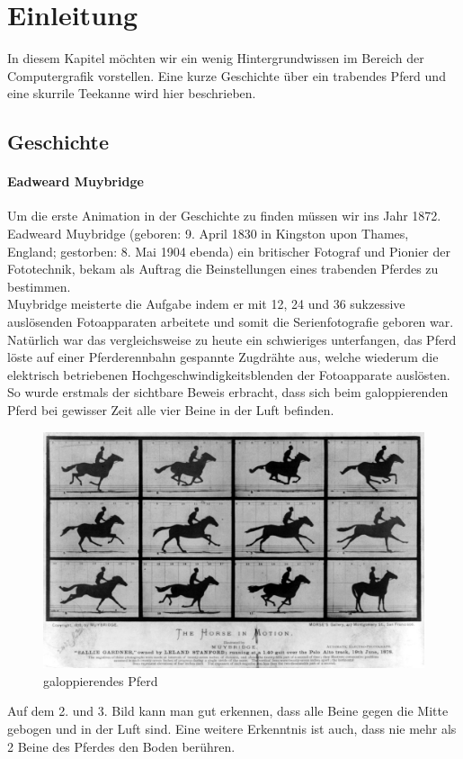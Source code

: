 \chapter{Einleitung}
In diesem Kapitel möchten wir ein wenig Hintergrundwissen im Bereich der Computergrafik vorstellen. Eine kurze Geschichte über ein trabendes Pferd und eine skurrile Teekanne wird hier beschrieben.

\section{Geschichte}

\subsubsection{Eadweard Muybridge}
Um die erste Animation in der Geschichte zu finden müssen wir ins Jahr 1872. 
Eadweard Muybridge (geboren: 9. April 1830 in Kingston upon Thames, England; gestorben: 8. Mai 1904 ebenda) 
ein britischer Fotograf und Pionier der Fototechnik, bekam als Auftrag die 
Beinstellungen eines trabenden Pferdes zu bestimmen. \\
Muybridge meisterte die Aufgabe indem er mit 12, 24 und 36 sukzessive auslösenden Fotoapparaten 
arbeitete und somit die Serienfotografie geboren war. Natürlich war das 
vergleichsweise zu heute ein schwieriges unterfangen, das Pferd löste auf 
einer Pferderennbahn gespannte Zugdrähte aus, welche wiederum die elektrisch 
betriebenen Hochgeschwindigkeitsblenden der Fotoapparate auslösten. So wurde 
erstmals der sichtbare Beweis erbracht, dass sich beim galoppierenden Pferd 
bei gewisser Zeit alle vier Beine in der Luft befinden.\\

\begin{figure}[htbp]
\center
\includegraphics[scale=0.25]{include/The_Horse_in_Motion.jpg}
\caption{galoppierendes Pferd}
\end{figure}
Auf dem 2. und 3. Bild kann man gut erkennen, dass alle Beine gegen die Mitte gebogen und in der Luft sind. Eine weitere Erkenntnis ist auch, dass nie mehr als 2 Beine des Pferdes den Boden berühren. 

